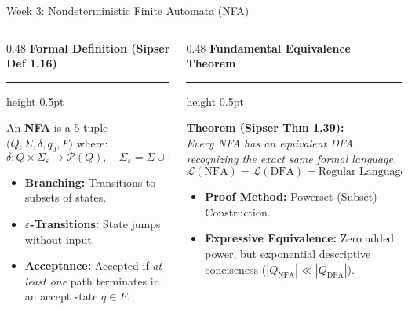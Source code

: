 \documentclass[aspectratio=169, 10pt]{beamer}
\newcommand{\colheader}[1]{%
  {\noindent\footnotesize\bfseries\color{gimpanavy}#1}%
  \vspace{0.03cm}%
  {\color{gimpanavy!30}\hrule height 0.5pt}%
  \vspace{0.08cm}%
}
\begin{document}
\begin{frame}{Week 3: Nondeterministic Finite Automata (NFA)}
  \begin{columns}[T]
    \begin{column}{0.48\textwidth}
      \colheader{Formal Definition (Sipser Def 1.16)}
      \begin{tcolorbox}[conceptcard]
        \footnotesize
        An \textbf{NFA} is a 5-tuple $\bigl(Q, \Sigma, \delta, q_0, F\bigr)$ where:
        $$\delta: Q \times \Sigma_{\varepsilon} \to \mathcal{P}(Q), \quad \Sigma_{\varepsilon} = \Sigma \cup \{\varepsilon\}$$
        \vspace{-0.15cm}
        \begin{itemize}\setlength{\itemsep}{2pt}\scriptsize
          \item \textbf{Branching:} Transitions to subsets of states.
          \item \textbf{$\varepsilon$-Transitions:} State jumps without input.
          \item \textbf{Acceptance:} Accepted if \textit{at least one} path terminates in an accept state $q \in F$.
        \end{itemize}
      \end{tcolorbox}
    \end{column}

    \hfill

    \begin{column}{0.48\textwidth}
      \colheader{Fundamental Equivalence Theorem}
      \begin{tcolorbox}[examplecard]
        \footnotesize
        \textbf{Theorem (Sipser Thm 1.39):} \\
        \textit{Every NFA has an equivalent DFA recognizing the exact same formal language.}
        $$\mathcal{L}(\text{NFA}) = \mathcal{L}(\text{DFA}) = \text{Regular Languages}$$
        \vspace{-0.15cm}
        \begin{itemize}\setlength{\itemsep}{2pt}\scriptsize
          \item \textbf{Proof Method:} Powerset (Subset) Construction.
          \item \textbf{Expressive Equivalence:} Zero added power, but exponential descriptive conciseness ($|Q_{\text{NFA}}| \ll |Q_{\text{DFA}}|$).
        \end{itemize}
      \end{tcolorbox}
    \end{column}
  \end{columns}
\end{frame}
\end{document}
